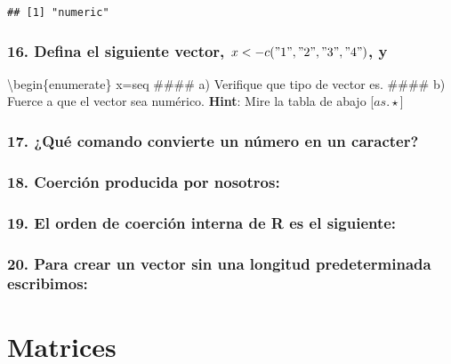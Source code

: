 \documentclass[
]{article}
\begin{document}
\begin{verbatim}
## [1] "numeric"
\end{verbatim}

\hypertarget{defina-el-siguiente-vector-x-c1234-y}{%
\subsubsection{\texorpdfstring{16. Defina el siguiente vector,
\quad \(x<-c("1","2","3","4")\),
y}{16. Defina el siguiente vector, x\textless-c("1","2","3","4"), y}}\label{defina-el-siguiente-vector-x-c1234-y}}

\textbackslash begin\{enumerate\} x=seq \#\#\#\# a) Verifique que tipo
de vector es. \#\#\#\# b) Fuerce a que el vector sea numérico.
\textbf{Hint}: Mire la tabla de abajo {[}\(as.\star\){]}

\hypertarget{quuxe9-comando-convierte-un-nuxfamero-en-un-caracter}{%
\subsubsection{17. ¿Qué comando convierte un número en un
caracter?}\label{quuxe9-comando-convierte-un-nuxfamero-en-un-caracter}}

\hypertarget{coerciuxf3n-producida-por-nosotros}{%
\subsubsection{18. Coerción producida por
nosotros:}\label{coerciuxf3n-producida-por-nosotros}}

\hypertarget{el-orden-de-coerciuxf3n-interna-de-r-es-el-siguiente}{%
\subsubsection{19. El orden de coerción interna de R es el
siguiente:}\label{el-orden-de-coerciuxf3n-interna-de-r-es-el-siguiente}}

\hypertarget{para-crear-un-vector-sin-una-longitud-predeterminada-escribimos}{%
\subsubsection{20. Para crear un vector sin una longitud predeterminada
escribimos:}\label{para-crear-un-vector-sin-una-longitud-predeterminada-escribimos}}

\hypertarget{matrices}{%
\section{\texorpdfstring{\textbf{Matrices}}{Matrices}}\label{matrices}}
\end{document}
